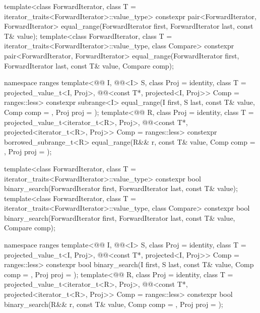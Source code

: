 \begin{codeblock}
{  template<class ForwardIterator, class T = iterator_traits<ForwardIterator>::value_type>
    constexpr pair<ForwardIterator, ForwardIterator>
      equal_range(ForwardIterator first, ForwardIterator last,
                  const T& value);
  template<class ForwardIterator, class T = iterator_traits<ForwardIterator>::value_type,
           class Compare>
    constexpr pair<ForwardIterator, ForwardIterator>
      equal_range(ForwardIterator first, ForwardIterator last,
                  const T& value, Compare comp);

  namespace ranges {
    template<@@ I, @@<I> S, class Proj = identity,
             class T = projected_value_t<I, Proj>,
             @@<const T*, projected<I, Proj>> Comp = ranges::less>
      constexpr subrange<I>
        equal_range(I first, S last, const T& value, Comp comp = {}, Proj proj = {});
    template<@@ R, class Proj = identity,
             class T = projected_value_t<iterator_t<R>, Proj>,
             @@<const T*, projected<iterator_t<R>, Proj>> Comp =
               ranges::less>
      constexpr borrowed_subrange_t<R>
        equal_range(R&& r, const T& value, Comp comp = {}, Proj proj = {});
  }

  template<class ForwardIterator, class T = iterator_traits<ForwardIterator>::value_type>
    constexpr bool
      binary_search(ForwardIterator first, ForwardIterator last,
                    const T& value);
  template<class ForwardIterator, class T = iterator_traits<ForwardIterator>::value_type,
           class Compare>
    constexpr bool
      binary_search(ForwardIterator first, ForwardIterator last,
                    const T& value, Compare comp);

  namespace ranges {
    template<@@ I, @@<I> S, class Proj = identity,
             class T = projected_value_t<I, Proj>,
             @@<const T*, projected<I, Proj>> Comp = ranges::less>
      constexpr bool binary_search(I first, S last, const T& value, Comp comp = {},
                                   Proj proj = {});
    template<@@ R, class Proj = identity,
             class T = projected_value_t<iterator_t<R>, Proj>,
             @@<const T*, projected<iterator_t<R>, Proj>> Comp =
               ranges::less>
      constexpr bool binary_search(R&& r, const T& value, Comp comp = {},
                                   Proj proj = {});
  }

}
\end{codeblock}
